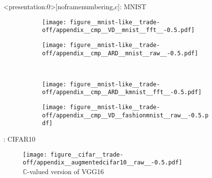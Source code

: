 \documentclass{beamer}
\newcommand{\cplx}{\mathbb{C}}
\begin{document}
\begin{frame}<presentation:0>[noframenumbering,c]{\insertsection: MNIST}
  \begin{figure}[t]
    \begin{subfigure}[b]{0.5\columnwidth}
      \centering
      \texttt{[image: figure\_\_mnist-like\_\_trade-off/appendix\_\_cmp\_\_VD\_\_mnist\_\_fft\_\_-0.5.pdf]}
    \end{subfigure}\hspace{-1em}%
    \begin{subfigure}[b]{0.5\columnwidth}
      \centering
      \texttt{[image: figure\_\_mnist-like\_\_trade-off/appendix\_\_cmp\_\_ARD\_\_mnist\_\_raw\_\_-0.5.pdf]}
    \end{subfigure} \\ %
    \begin{subfigure}[b]{0.5\columnwidth}
      \centering
      \texttt{[image: figure\_\_mnist-like\_\_trade-off/appendix\_\_cmp\_\_ARD\_\_kmnist\_\_fft\_\_-0.5.pdf]}
    \end{subfigure}\hspace{-1em}%
    \begin{subfigure}[b]{0.5\columnwidth}
      \centering
      \texttt{[image: figure\_\_mnist-like\_\_trade-off/appendix\_\_cmp\_\_VD\_\_fashionmnist\_\_raw\_\_-0.5.pdf]}
    \end{subfigure}%
  \end{figure}

\end{frame}

\begin{frame}[c]{\insertsection: CIFAR10}
  \begin{figure}[t]
    \centering
    \texttt{[image: figure\_\_cifar\_\_trade-off/appendix\_\_augmentedcifar10\_\_raw\_\_-0.5.pdf]}
    \\
    {$\cplx$-valued version of VGG16 \citep{simonyan_very_2015}}
  \end{figure}

\end{frame}
\end{document}
